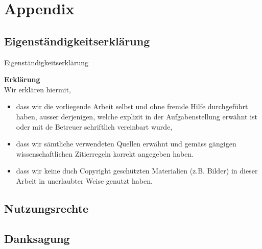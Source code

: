 \chapter{Appendix}

{}
\section*{Eigenständigkeitserklärung}
Eigenständigkeitserklärung

\vspace{2 cm}

\noindent \textbf{Erklärung} \\
Wir erklären hiermit, \\

\begin{itemize}
    \item dass wir die vorliegende Arbeit selbst und ohne fremde Hilfe durchgeführt haben, ausser derjenigen, welche explizit in der Aufgabenstellung erwähnt ist oder mit de Betreuer schriftlich vereinbart wurde,
    \item dass wir sämtliche verwendeten Quellen erwähnt und gemäss gängigen wissen\-schaftlichen Zitierregeln korrekt angegeben haben.
    \item dass wir keine duch Copyright geschützten Materialien (z.B. Bilder) in dieser Arbeit in unerlaubter Weise genutzt haben.
\end{itemize}

\vspace{2cm}


\vspace{2cm}


\vspace{2cm}



\section*{Nutzungsrechte}


\section*{Danksagung}
